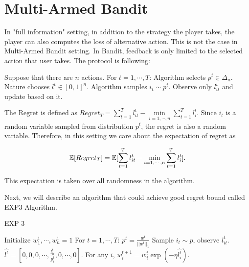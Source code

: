 \documentclass[../main.tex]{subfiles}
\begin{document}
\chapter{Multi-Armed Bandit}

In "full information" setting, in addition to the strategy the player takes, the player can also computes the loss of alternative action. This is not the case in Multi-Armed Bandit setting. In Bandit, feedback is only limited to the selected action that user takes. The protocol is following:


\begin{algorithm}
	\begin{algorithmic}
		\STATE Suppose that there are $n$ actions.
		\STATE For $t = 1,\cdots ,T$:
		\bindent 
		\STATE Algorithm selects $p^t \in \Delta_n$.
		\STATE Nature chooses $l^t \in [0,1]^n$.
		\STATE Algorithm samples $i_t \sim p^t$.
		\STATE Observe only $l^t_{it}$ and update based on it.
		\eindent
	\end{algorithmic}
\end{algorithm}

The Regret is defined as $Regret_T = \sum\limits_{t=1}^T l^t_{it} - \min\limits_{i=1,\cdots, n} \sum\limits_{t=1}^T l^t_{i}$. Since $i_t$ is a random variable sampled from distribution $p^t$, the regret is also a random variable. Therefore, in this setting we care about the expectation of regret as

\begin{equation*}
	\begin{aligned}
		\mathbb{E} [Regret_T] = \mathbb{E} [\sum\limits_{t=1}^T l^t_{it} - \min\limits_{i=1,\cdots, n} \sum\limits_{t=1}^T l^t_{i}].
	\end{aligned}
\end{equation*}

This expectation is taken over all randomness in the algorithm.

Next, we will describe an algorithm that could achieve good regret bound called EXP3 Algorithm.

\begin{algorithm}[H]
	\caption{EXP 3}
	\begin{algorithmic}
		\STATE Initialize $w_1^1,\cdots, w_n^1 = 1$
		\STATE For $t = 1,\cdots ,T$:
		\bindent 
		\STATE $p^t = \frac{w^t}{||w^t||_1}$
		\STATE Sample $i_t \sim p$, observe $l_{it}^t$.
		\STATE $\hat{l^t} = [0,0,0,\cdots, \frac{l^t_{it}}{p_i^t}, 0,\cdots,0]$.
		\STATE For any $i$, $w_i^{t+1} = w_i^t \exp(-\eta \hat{l_i^t})$.
		\eindent
	\end{algorithmic}
\end{algorithm}
\end{document}
